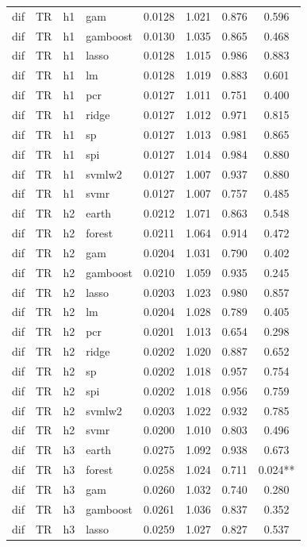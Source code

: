 \begin{ThreePartTable}
\begin{longtable}[t]{llclcccc}
dif & TR & h1 & gam & 0.0128 & 1.021 & 0.876 & 0.596\\
dif & TR & h1 & gamboost & 0.0130 & 1.035 & 0.865 & 0.468\\
dif & TR & h1 & lasso & 0.0128 & 1.015 & 0.986 & 0.883\\
dif & TR & h1 & lm & 0.0128 & 1.019 & 0.883 & 0.601\\
dif & TR & h1 & pcr & 0.0127 & 1.011 & 0.751 & 0.400\\
dif & TR & h1 & ridge & 0.0127 & 1.012 & 0.971 & 0.815\\
dif & TR & h1 & sp & 0.0127 & 1.013 & 0.981 & 0.865\\
dif & TR & h1 & spi & 0.0127 & 1.014 & 0.984 & 0.880\\
dif & TR & h1 & svmlw2 & 0.0127 & 1.007 & 0.937 & 0.880\\
dif & TR & h1 & svmr & 0.0127 & 1.007 & 0.757 & 0.485\\
\addlinespace
dif & TR & h2 & earth & 0.0212 & 1.071 & 0.863 & 0.548\\
dif & TR & h2 & forest & 0.0211 & 1.064 & 0.914 & 0.472\\
dif & TR & h2 & gam & 0.0204 & 1.031 & 0.790 & 0.402\\
dif & TR & h2 & gamboost & 0.0210 & 1.059 & 0.935 & 0.245\\
dif & TR & h2 & lasso & 0.0203 & 1.023 & 0.980 & 0.857\\
dif & TR & h2 & lm & 0.0204 & 1.028 & 0.789 & 0.405\\
dif & TR & h2 & pcr & 0.0201 & 1.013 & 0.654 & 0.298\\
dif & TR & h2 & ridge & 0.0202 & 1.020 & 0.887 & 0.652\\
dif & TR & h2 & sp & 0.0202 & 1.018 & 0.957 & 0.754\\
dif & TR & h2 & spi & 0.0202 & 1.018 & 0.956 & 0.759\\
dif & TR & h2 & svmlw2 & 0.0203 & 1.022 & 0.932 & 0.785\\
dif & TR & h2 & svmr & 0.0200 & 1.010 & 0.803 & 0.496\\
\addlinespace
dif & TR & h3 & earth & 0.0275 & 1.092 & 0.938 & 0.673\\
dif & TR & h3 & forest & 0.0258 & 1.024 & 0.711 & 0.024**\\
dif & TR & h3 & gam & 0.0260 & 1.032 & 0.740 & 0.280\\
dif & TR & h3 & gamboost & 0.0261 & 1.036 & 0.837 & 0.352\\
dif & TR & h3 & lasso & 0.0259 & 1.027 & 0.827 & 0.537\\

\end{longtable}
\end{ThreePartTable}
